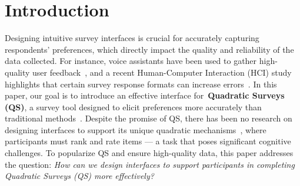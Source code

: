 \section{Introduction}

Designing intuitive survey interfaces is crucial for accurately capturing respondents' preferences, which directly impact the quality and reliability of the data collected. For instance, voice assistants have been used to gather high-quality user feedback~\cite{xiaoLetMeAsk2021}, and a recent Human-Computer Interaction (HCI) study highlights that certain survey response formats can increase errors~\cite{pielotDidYouMisclick2024}. In this paper, our goal is to introduce an effective interface for~\textbf{Quadratic Surveys (QS)}, a survey tool designed to elicit preferences more accurately than traditional methods~\cite{chengCanShowWhat2021}. Despite the promise of QS, there has been no research on designing interfaces to support its unique quadratic mechanisms~\cite{grovesOptimalAllocationPublic1977}, where participants must rank and rate items --- a task that poses significant cognitive challenges. To popularize QS and ensure high-quality data, this paper addresses the question: \textit{How can we design interfaces to support participants in completing Quadratic Surveys (QS) more effectively?}

